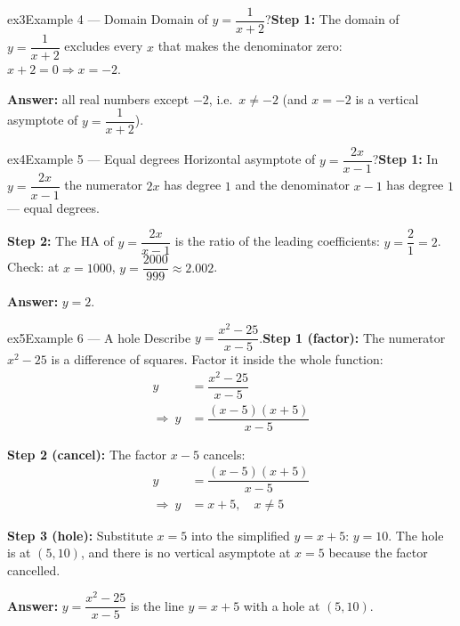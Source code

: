 \documentclass[11pt]{article}
\begin{document}
\begin{example}{ex3}{Example 4 --- Domain}
Domain of $y=\dfrac{1}{x+2}$?\soln \textbf{Step 1:} The domain of $y=\dfrac{1}{x+2}$ excludes every $x$ that makes the denominator zero: $x+2=0\Rightarrow x=-2$.

\textbf{Answer:} all real numbers except $-2$, i.e.\ $x\ne-2$ (and $x=-2$ is a vertical asymptote of $y=\dfrac{1}{x+2}$).
\end{example}

\begin{example}{ex4}{Example 5 --- Equal degrees}
Horizontal asymptote of $y=\dfrac{2x}{x-1}$?\soln \textbf{Step 1:} In $y=\dfrac{2x}{x-1}$ the numerator $2x$ has degree $1$ and the denominator $x-1$ has degree $1$ --- equal degrees.

\textbf{Step 2:} The HA of $y=\dfrac{2x}{x-1}$ is the ratio of the leading coefficients: $y=\dfrac21=2$. Check: at $x=1000$, $y=\dfrac{2000}{999}\approx2.002$.

\textbf{Answer:} $y=2$.
\end{example}

\begin{example}{ex5}{Example 6 --- A hole}
Describe $y=\dfrac{x^2-25}{x-5}$.\soln \textbf{Step 1 (factor):} The numerator $x^2-25$ is a difference of squares. Factor it inside the whole function:\[\begin{aligned}y&=\dfrac{x^2-25}{x-5}\\\Rightarrow\ y&=\dfrac{(x-5)(x+5)}{x-5}\end{aligned}\]

\textbf{Step 2 (cancel):} The factor $x-5$ cancels:\[\begin{aligned}y&=\dfrac{(x-5)(x+5)}{x-5}\\\Rightarrow\ y&=x+5,\quad x\ne5\end{aligned}\]

\textbf{Step 3 (hole):} Substitute $x=5$ into the simplified $y=x+5$: $y=10$. The hole is at $(5,10)$, and there is no vertical asymptote at $x=5$ because the factor cancelled.

\textbf{Answer:} $y=\dfrac{x^2-25}{x-5}$ is the line $y=x+5$ with a hole at $(5,10)$.
\end{example}
\end{document}

